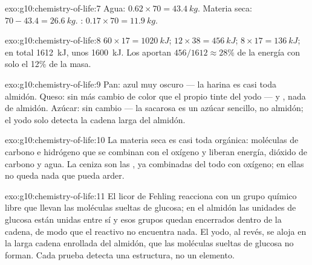 \begin{solution}{exo:g10:chemistry-of-life:7}
Agua: $0.62 \times 70 = \qty{43.4}{kg}$. Materia seca: $70 - 43.4 =
\qty{26.6}{kg}$. : $0.17 \times 70 = \qty{11.9}{kg}$.
\end{solution}

\begin{solution}{exo:g10:chemistry-of-life:8}
 $60 \times 17 = \qty{1020}{kJ}$;  $12 \times 38 =
\qty{456}{kJ}$;  $8 \times 17 = \qty{136}{kJ}$; en total
\qty{1612}{kJ}, unos \qty{1600}{kJ}. Los  aportan $456/1612 \approx
28\%$ de la energía con solo el 12\% de la masa.
\end{solution}

\begin{solution}{exo:g10:chemistry-of-life:9}
Pan: azul muy oscuro --- la harina es casi toda almidón. Queso: sin más
cambio de color que el propio tinte del yodo ---  y ,
nada de almidón. Azúcar: sin cambio --- la sacarosa es un azúcar
sencillo, no almidón; el yodo solo detecta la cadena larga del almidón.
\end{solution}

\begin{solution}{exo:g10:chemistry-of-life:10}
La materia seca es casi toda orgánica: moléculas de carbono e
hidrógeno que se combinan con el oxígeno y liberan energía, dióxido de
carbono y agua. La ceniza son las , ya combinadas del
todo con oxígeno; en ellas no queda nada que pueda arder.
\end{solution}

\begin{solution}{exo:g10:chemistry-of-life:11}
El licor de Fehling reacciona con un grupo químico libre que llevan las
moléculas sueltas de glucosa; en el almidón las unidades de glucosa
están unidas entre sí y esos grupos quedan encerrados dentro de la
cadena, de modo que el reactivo no encuentra nada. El yodo, al revés,
se aloja en la larga cadena enrollada del almidón, que las moléculas
sueltas de glucosa no forman. Cada prueba detecta una estructura, no un
elemento.
\end{solution}

